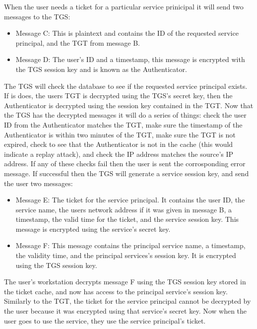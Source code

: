 \documentclass[]{report}   %
\begin{document}
When the user needs a ticket for a particular service prinicipal it will send two messages to the TGS:
\begin{itemize}
\item Message C: This is plaintext and contains the ID of the requested service principal, and the TGT from message B.
\item Message D: The user's ID and a timestamp, this message is encrypted with the TGS session key and is known as the Authenticator.
\end{itemize}

The TGS will check the database to see if the requested service principal exists. If is does, the users TGT is decrypted using the TGS's secret key, then the Authenticator is decrypted using the session key contained in the TGT. Now that the TGS has the decrypted messages it will do a series of things: check the user ID from the Authenticator matches the TGT, make sure the timestamp of the Authenticator is within two minutes of the TGT, make sure the TGT is not expired, check to see that the Authenticator is not in the cache (this would indicate a replay attack), and check the IP address matches the source's IP address. If any of these checks fail then the user is sent the corrosponding error message. If successful then the TGS will generate a service session key, and send the user two messages:

\begin{itemize}
\item Message E: The ticket for the service principal. It contains the user ID, the service name, the users network address if it was given in message B, a timestamp, the valid time for the ticket, and the service session key. This message is encrypted using the service's secret key.
\item Message F: This message contains the principal service name, a timestamp, the validity time, and the principal services's session key. It is encrypted using the TGS session key.
\end{itemize}

The user's workstation decrypts message F using the TGS session key stored in the ticket cache, and now has access to the principal service's session key. Similarly to the TGT, the ticket for the service principal cannot be decrypted by the user because it was encrypted using that service's secret key. Now when the user goes to use the service, they use the service principal's ticket.
\end{document}
